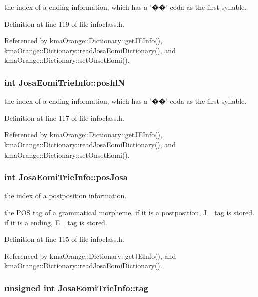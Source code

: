 the index of a ending information, which has a '��' coda as the first syllable. 



Definition at line 119 of file infoclass.h.

Referenced by kmaOrange::Dictionary::getJEInfo(), kmaOrange::Dictionary::readJosaEomiDictionary(), and kmaOrange::Dictionary::setOnsetEomi().\hypertarget{classJosaEomiTrieInfo_4914dd1866b5fc75ebe8a0cc152edfc3}{
\subsubsection[{poshlN}]{\setlength{\rightskip}{0pt plus 5cm}int {\bf JosaEomiTrieInfo::poshlN}}}
\label{classJosaEomiTrieInfo_4914dd1866b5fc75ebe8a0cc152edfc3}


the index of a ending information, which has a '��' coda as the first syllable. 



Definition at line 117 of file infoclass.h.

Referenced by kmaOrange::Dictionary::getJEInfo(), kmaOrange::Dictionary::readJosaEomiDictionary(), and kmaOrange::Dictionary::setOnsetEomi().\hypertarget{classJosaEomiTrieInfo_cf93b6828d86eef11b44e31dcdb64c8a}{
\subsubsection[{posJosa}]{\setlength{\rightskip}{0pt plus 5cm}int {\bf JosaEomiTrieInfo::posJosa}}}
\label{classJosaEomiTrieInfo_cf93b6828d86eef11b44e31dcdb64c8a}


the index of a postposition information. 

the POS tag of a grammatical morpheme. if it is a postposition, J\_\- tag is stored. if it is a ending, E\_\- tag is stored. 

Definition at line 115 of file infoclass.h.

Referenced by kmaOrange::Dictionary::getJEInfo(), and kmaOrange::Dictionary::readJosaEomiDictionary().\hypertarget{classJosaEomiTrieInfo_8294fbdd59f02d0448137cfc6b4a9f4d}{
\subsubsection[{tag}]{\setlength{\rightskip}{0pt plus 5cm}unsigned int {\bf JosaEomiTrieInfo::tag}}}
\label{classJosaEomiTrieInfo_8294fbdd59f02d0448137cfc6b4a9f4d}




